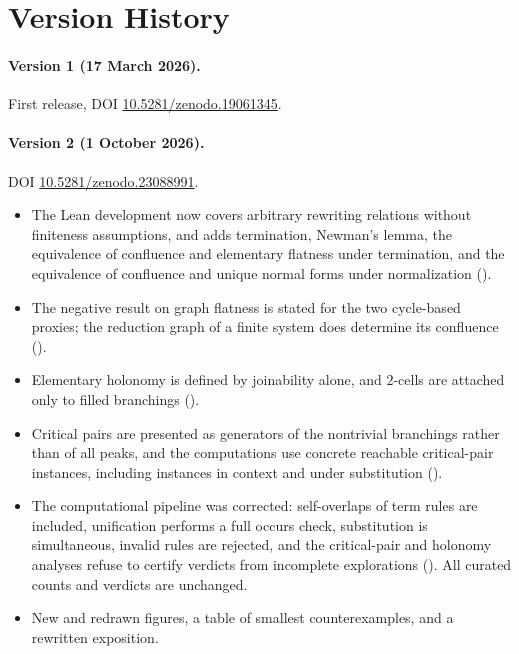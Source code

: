 \section{Version History}
\label{app:version-history}

\paragraph{Version 1 (17 March 2026).} First release, DOI \href{https://doi.org/10.5281/zenodo.19061345}{10.5281/zenodo.19061345}.

\paragraph{Version 2 (1 October 2026).} DOI \href{https://doi.org/10.5281/zenodo.23088991}{10.5281/zenodo.23088991}.
\begin{itemize}
    \item The Lean development now covers arbitrary rewriting relations without finiteness assumptions, and adds termination, Newman's lemma, the equivalence of confluence and elementary flatness under termination, and the equivalence of confluence and unique normal forms under normalization ().
    \item The negative result on graph flatness is stated for the two cycle-based proxies; the reduction graph of a finite system does determine its confluence ().
    \item Elementary holonomy is defined by joinability alone, and $2$-cells are attached only to filled branchings ().
    \item Critical pairs are presented as generators of the nontrivial branchings rather than of all peaks, and the computations use concrete reachable critical-pair instances, including instances in context and under substitution ().
    \item The computational pipeline was corrected: self-overlaps of term rules are included, unification performs a full occurs check, substitution is simultaneous, invalid rules are rejected, and the critical-pair and holonomy analyses refuse to certify verdicts from incomplete explorations (). All curated counts and verdicts are unchanged.
    \item New and redrawn figures, a table of smallest counterexamples, and a rewritten exposition.
\end{itemize}
